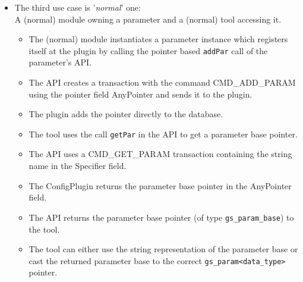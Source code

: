 \begin{itemize}
  \item The third use case is '{\em normal}' one:\\
           A (normal) module owning a parameter and a (normal) tool accessing it.
  \begin{itemize}
    \item The (normal) module instantiates a parameter instance which registers itself at the plugin by calling the pointer based \lstinline|addPar| call of the parameter's API.
    \item The API creates a transaction with the command CMD\_ADD\_PARAM using the pointer field \textsf{AnyPointer} and sends it to the plugin.
    \item The plugin adds the pointer directly to the database.
    \item The tool uses the call \lstinline|getPar| in the API to get a parameter base pointer.
    \item The API uses a CMD\_GET\_PARAM transaction containing the string name in the \textsf{Specifier} field.
    \item The ConfigPlugin returns the parameter base pointer in the \textsf{AnyPointer} field.
    \item The API returns the parameter base pointer (of type \lstinline|gs_param_base|) to the tool.
    \item The tool can either use the string representation of the parameter base or cast the returned parameter base to the correct \lstinline|gs_param<data_type>| pointer.
  \end{itemize}

\end{itemize}


